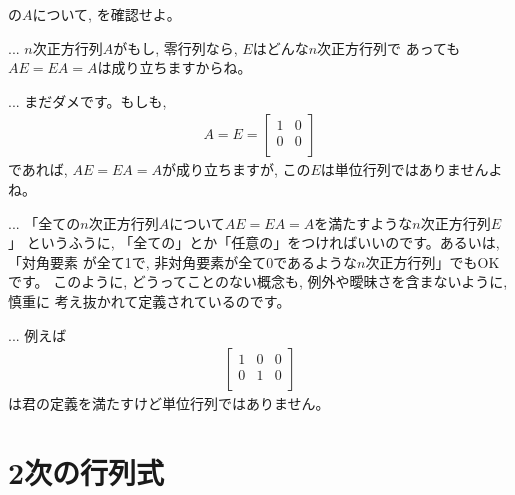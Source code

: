 \begin{q}\label{q:matrix_unit0} の$A$について, 
を確認せよ。\end{q}

\begin{faq}{\small{}
... $n$次正方行列$A$がもし, 零行列なら, $E$はどんな$n$次正方行列で
あっても$AE=EA=A$は成り立ちますからね。}\end{faq}

\begin{faq}{\small{}
... まだダメです。もしも, 
\begin{eqnarray*}
A=E=\begin{bmatrix}
1 & 0 \\
0 & 0 \\
\end{bmatrix}
\end{eqnarray*}
であれば, $AE=EA=A$が成り立ちますが, この$E$は単位行列ではありませんよね。}\end{faq}

\begin{faq}{\small{}
... 「全ての$n$次正方行列$A$について$AE=EA=A$を満たすような$n$次正方行列$E$」
というふうに, 「全ての」とか「任意の」をつければいいのです。あるいは, 「対角要素
が全て1で, 非対角要素が全て0であるような$n$次正方行列」でもOKです。
このように, どうってことのない概念も, 例外や曖昧さを含まないように, 慎重に
考え抜かれて定義されているのです。}\end{faq}

\begin{faq}{\small{}
... 例えば
\begin{eqnarray*}
\begin{bmatrix}
1 & 0 & 0\\
0 & 1 & 0\\
\end{bmatrix}
 \end{eqnarray*}
は君の定義を満たすけど単位行列ではありません。}\end{faq}
\vv


\section{2次の行列式}\label{sec:det}

